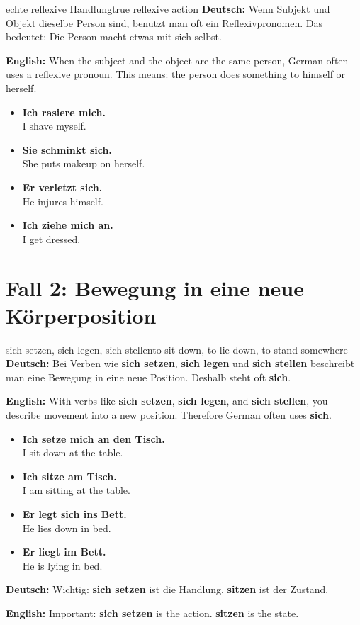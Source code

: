 \documentclass[a4paper,11pt]{article}
\newcommand{\GermanText}[1]{\textbf{Deutsch: }#1\par}
\newcommand{\EnglishText}[1]{{\small\color{SoftGray}\textbf{English: }#1\par}}
\newcommand{\ExampleItem}[2]{\item \textbf{#1}\\{\small\color{SoftGray}#2}}
\begin{document}
        \begin{grammarentry}{echte reflexive Handlung}{true reflexive action}
            \GermanText{Wenn Subjekt und Objekt dieselbe Person sind, benutzt man oft ein Reflexivpronomen. Das bedeutet: Die Person macht etwas mit sich selbst.}
            \EnglishText{When the subject and the object are the same person, German often uses a reflexive pronoun. This means: the person does something to himself or herself.}
            
            \begin{exbox}
                \begin{itemize}
                    \ExampleItem{Ich rasiere mich.}{I shave myself.}
                    \ExampleItem{Sie schminkt sich.}{She puts makeup on herself.}
                    \ExampleItem{Er verletzt sich.}{He injures himself.}
                    \ExampleItem{Ich ziehe mich an.}{I get dressed.}
                \end{itemize}
            \end{exbox}
        \end{grammarentry}
    
    
    \section{Fall 2: Bewegung in eine neue Körperposition}
        
        \begin{grammarentry}{sich setzen, sich legen, sich stellen}{to sit down, to lie down, to stand somewhere}
            \GermanText{Bei Verben wie \textbf{sich setzen}, \textbf{sich legen} und \textbf{sich stellen} beschreibt man eine Bewegung in eine neue Position. Deshalb steht oft \textbf{sich}.}
            \EnglishText{With verbs like \textbf{sich setzen}, \textbf{sich legen}, and \textbf{sich stellen}, you describe movement into a new position. Therefore German often uses \textbf{sich}.}
            
            \begin{exbox}
                \begin{itemize}
                    \ExampleItem{Ich setze mich an den Tisch.}{I sit down at the table.}
                    \ExampleItem{Ich sitze am Tisch.}{I am sitting at the table.}
                    \ExampleItem{Er legt sich ins Bett.}{He lies down in bed.}
                    \ExampleItem{Er liegt im Bett.}{He is lying in bed.}
                \end{itemize}
            \end{exbox}
            
            \GermanText{Wichtig: \textbf{sich setzen} ist die Handlung. \textbf{sitzen} ist der Zustand.}
            \EnglishText{Important: \textbf{sich setzen} is the action. \textbf{sitzen} is the state.}
        \end{grammarentry}
    
\end{document}
